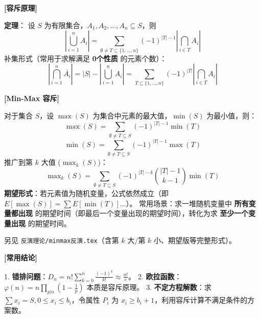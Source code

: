 \textbf{[容斥原理]}

\textbf{定理}：
设 $S$ 为有限集合，$A_1, A_2, \dots, A_n \subseteq S$，则
\[
\left| \bigcup_{i=1}^n A_i \right| = \sum_{\emptyset \neq T \subseteq \{1, \dots, n\}} (-1)^{|T|-1} \left| \bigcap_{i \in T} A_i \right|
\]
补集形式（常用于求解满足 \textbf{0个性质} 的元素个数）：
\[
\left| \bigcap_{i=1}^n \overline{A_i} \right| = |S| - \left| \bigcup_{i=1}^n A_i \right| = \sum_{T \subseteq \{1, \dots, n\}} (-1)^{|T|} \left| \bigcap_{i \in T} A_i \right|
\]

\textbf{[Min-Max 容斥]}

对于集合 $S$，设 $\max(S)$ 为集合中元素的最大值，$\min(S)$ 为最小值，则：
\[
\max(S) = \sum_{\emptyset \neq T \subseteq S} (-1)^{|T|-1} \min(T)
\]
\[
\min(S) = \sum_{\emptyset \neq T \subseteq S} (-1)^{|T|-1} \max(T)
\]
推广到第 $k$ 大值 ($\max_k(S)$)：
\[
\max\nolimits_k(S) = \sum_{\emptyset \neq T \subseteq S} (-1)^{|T|-k} \binom{|T|-1}{k-1} \min(T)
\]
\textbf{期望形式}：若元素值为随机变量，公式依然成立（即 $E[\max(S)] = \sum E[\min(T)] \dots$）。
常用场景：求一堆随机变量中 \textbf{所有变量都出现} 的期望时间（即最后一个变量出现的期望时间），转化为求 \textbf{至少一个变量出现} 的期望时间。

另见 \texttt{反演理论/minmax反演.tex}（含第 $k$ 大/第 $k$ 小、期望版等完整形式）。

\textbf{[常用结论]}

1.  \textbf{错排问题}：$D_n = n! \sum_{k=0}^n \frac{(-1)^k}{k!} \approx \frac{n!}{e}$。
2.  \textbf{欧拉函数}：$\varphi(n) = n \prod_{p|n} (1 - \frac{1}{p})$ 本质是容斥原理。
3.  \textbf{不定方程解数}：求 $\sum x_i = S, 0 \le x_i \le b_i$，令属性 $P_i$ 为 $x_i \ge b_i + 1$，利用容斥计算不满足条件的方案数。
